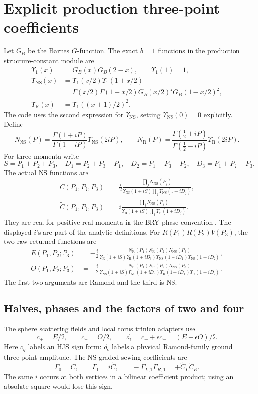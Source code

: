 \documentclass[11pt]{article}
\newcommand{\NS}{\mathrm{NS}}
\newcommand{\R}{\mathrm{R}}
\newcommand{\U}{\Upsilon}
\newcommand{\Ct}{\widetilde C}
\begin{document}
\section{Explicit production three-point coefficients}
\label{sec:constants}
Let \(G_B\) be the Barnes \(G\)-function. The exact \(b=1\) functions
in the production structure-constant module are
\begin{align}
 \U_1(x)&=G_B(x)G_B(2-x),\qquad \U_1(1)=1,\\
 \U_\NS(x)&=\U_1(x/2)\U_1(1+x/2)\nonumber\\
 &=\Gamma(x/2)\Gamma(1-x/2)G_B(x/2)^2G_B(1-x/2)^2,\\
 \U_\R(x)&=\U_1((x+1)/2)^2.
\end{align}
The code uses the second expression for \(\U_\NS\), setting
\(\U_\NS(0)=0\) explicitly. Define
\begin{equation}
 N_\NS(P)=\frac{\Gamma(1+iP)}{\Gamma(1-iP)}\U_\NS(2iP),\qquad
 N_\R(P)=\frac{\Gamma(\frac12+iP)}{\Gamma(\frac12-iP)}\U_\R(2iP).
 \label{eq:legs}
\end{equation}
For three momenta write
\[
 S=P_1+P_2+P_3,\quad
 D_1=P_2+P_3-P_1,\quad D_2=P_1+P_3-P_2,\quad D_3=P_1+P_2-P_3.
\]
The actual NS functions are
\begin{align}
 C(P_1,P_2,P_3)&=\frac{i}{2}
 \frac{\prod_jN_\NS(P_j)}
 {\U_\NS(1+iS)\prod_j\U_\NS(1+iD_j)},\label{eq:C}\\
 \Ct(P_1,P_2,P_3)&=i
 \frac{\prod_jN_\NS(P_j)}
 {\U_\R(1+iS)\prod_j\U_\R(1+iD_j)}.\label{eq:Ct}
\end{align}
They are real for positive real momenta in the BRY phase convention
\cite{BRY}. The displayed \(i\)'s are part of the analytic definitions.
For \(R(P_1)R(P_2)V(P_3)\), the two raw returned functions are
\begin{align}
 E(P_1,P_2;P_3)&=-\frac{i}{2}
 \frac{N_\R(P_1)N_\R(P_2)N_\NS(P_3)}
 {\U_\R(1+iS)\U_\R(1+iD_3)\U_\NS(1+iD_1)\U_\NS(1+iD_2)},
 \label{eq:E}\\
 O(P_1,P_2;P_3)&=-\frac{i}{2}
 \frac{N_\R(P_1)N_\R(P_2)N_\NS(P_3)}
 {\U_\NS(1+iS)\U_\NS(1+iD_3)\U_\R(1+iD_1)\U_\R(1+iD_2)}.
 \label{eq:O}
\end{align}
The first two arguments are Ramond and the third is NS.

\subsection{Halves, phases and the factors of two and four}
The sphere scattering fields and local torus trinion adapters use
\begin{equation}
 c_+=E/2,\qquad c_-=O/2,\qquad
 d_\epsilon=c_++\epsilon c_-=(E+\epsilon O)/2.
 \label{eq:sc-dictionary}
\end{equation}
Here \(c_\eta\) labels an HJS sign form; \(d_\epsilon\) labels a
physical Ramond-family ground three-point amplitude. The NS graded
sewing coefficients are
\begin{equation}
 \Gamma_0=C,\qquad \Gamma_1=i\Ct,\qquad
 -\Gamma_{L,1}\Gamma_{R,1}=+\Ct_L\Ct_R.
 \label{eq:ns-phase}
\end{equation}
The same \(i\) occurs at both vertices in a bilinear coefficient product;
using an absolute square would lose this sign.
\end{document}
